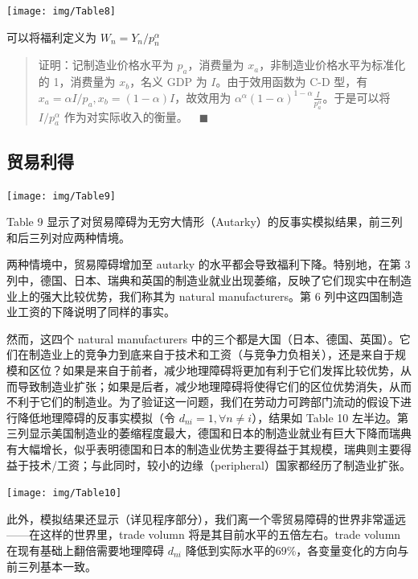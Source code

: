 \documentclass[
]{article}
\begin{document}
\begin{center}\texttt{[image: img/Table8]} \end{center}

可以将福利定义为 \(W_n = Y_n/{p_n^\alpha}\)

\begin{quote}
证明：记制造业价格水平为 \(p_a\)，消费量为 \(x_a\)，非制造业价格水平为标准化的
1，消费量为 \(x_b\)，名义 GDP 为 \(I\)。由于效用函数为 C-D 型，有
\(x_a = \alpha I/p_a, x_b = (1-\alpha)I\)，故效用为
\(\alpha^{\alpha}(1-\alpha)^{1-\alpha} \frac{I}{p_a^{\alpha}}\)。于是可以将
\(I/{p_a^\alpha}\) 作为对实际收入的衡量。\(\quad \blacksquare\)
\end{quote}

\hypertarget{ux8d38ux6613ux5229ux5f97}{%
\subsection{贸易利得}\label{ux8d38ux6613ux5229ux5f97}}

\begin{center}\texttt{[image: img/Table9]} \end{center}

Table 9
显示了对贸易障碍为无穷大情形（Autarky）的反事实模拟结果，前三列和后三列对应两种情境。

两种情境中，贸易障碍增加至 autarky 的水平都会导致福利下降。特别地，在第 3
列中，德国、日本、瑞典和英国的制造业就业出现萎缩，反映了它们现实中在制造业上的强大比较优势，我们称其为 natural manufacturers。第 6 列中这四国制造业工资的下降说明了同样的事实。

然而，这四个 natural manufacturers 中的三个都是大国（日本、德国、英国）。它们在制造业上的竞争力到底来自于技术和工资（与竞争力负相关），还是来自于规模和区位？如果是来自于前者，减少地理障碍将更加有利于它们发挥比较优势，从而导致制造业扩张；如果是后者，减少地理障碍将使得它们的区位优势消失，从而不利于它们的制造业。为了验证这一问题，我们在劳动力可跨部门流动的假设下进行降低地理障碍的反事实模拟（令
\(d_{n i}=1, \forall n \neq i\)），结果如 Table 10
左半边。第三列显示美国制造业的萎缩程度最大，德国和日本的制造业就业有巨大下降而瑞典有大幅增长，似乎表明德国和日本的制造业优势主要得益于其规模，瑞典则主要得益于技术/工资；与此同时，较小的边缘（peripheral）国家都经历了制造业扩张。

\begin{center}\texttt{[image: img/Table10]} \end{center}

此外，模拟结果还显示（详见程序部分），我们离一个零贸易障碍的世界非常遥远------在这样的世界里，trade volumn 将是其目前水平的五倍左右。trade volumn 在现有基础上翻倍需要地理障碍 \(d_{n i}\) 降低到实际水平的69\%，各变量变化的方向与前三列基本一致。
\end{document}
